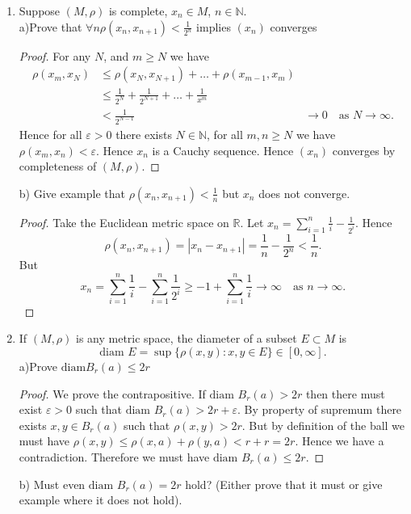 
\begin{enumerate}
	\item Suppose $(M, \rho)$ is complete, $x_n \in M$, $n \in \mathbb{N}$.\\
		a)Prove that $\forall n \rho(x_n, x_{n+1}) < \frac{1}{2^n}$ implies $(x_n)$ converges
		\begin{proof}
			For any $N$, and $m\ge N$ we have
			\begin{align*}
				\rho(x_m, x_N) &\le \rho(x_N, x_{N+1}) + \ldots + \rho(x_{m-1}, x_m) \\
				&\le \frac{1}{2^N} + \frac{1}{2^{N+1}} + \ldots + \frac{1}{x^m} \\
				&< \frac{1}{2^{N-1}}
				& \to  0 \quad \text{as }N \to  \infty 
			.\end{align*}
			Hence for all $\varepsilon>0$ there exists $N \in \mathbb{N}$, for all $m, n \ge N$ we have $\rho(x_m, x_n) < \varepsilon$. Hence $x_n$ is a Cauchy sequence. Hence $(x_n)$ converges by completeness of $(M, \rho)$.
		\end{proof}
		b) Give example that $\rho(x_n, x_{n+1}) < \frac{1}{n}$ but $x_n$ does not converge.
		\begin{proof}
			Take the Euclidean metric space on $\mathbb{R}$. Let $x_n = \sum_{i=1}^{n} \frac{1}{i} - \frac{1}{2^i}$. Hence
			\[
				\rho(x_n, x_{n+1}) = \left| x_n - x_{n+1} \right|  = \frac{1}{n} - \frac{1}{2^n} < \frac{1}{n}
			.\] 
			But
			\[
				x_n = \sum_{i=1}^{n} \frac{1}{i} - \sum_{i=1}^{n} \frac{1}{2^i} \ge - 1 + \sum_{i=1}^{n} \frac{1}{i} \to  \infty \quad \text{as } n \to \infty 
			.\] 
		\end{proof}
	\item If $(M, \rho)$ is any metric space, the diameter of a subset $E \subset M$ is
		\[
			\text{diam }E = \operatorname{sup} \{\rho(x, y): x, y \in E\}  \in [0,\infty ]
		.\] 
		a)Prove $\text{diam} B_r(a) \le  2 r$
		\begin{proof}
			We prove the contrapositive. If $\text{diam }B_r(a) > 2 r$ then there must exist $\varepsilon > 0$ such that $\text{diam }B_r(a) > 2 r + \varepsilon$. 
			By property of supremum there exists $x, y \in B_r(a)$ such that $\rho(x, y)> 2 r$. But by definition of the ball we must have $\rho(x, y) \le \rho(x, a) + \rho(y, a) < r + r = 2 r$. Hence we have a contradiction. Therefore we must have $\text{diam }B_r(a) \le 2r$.
		\end{proof}
		b) Must even $\text{diam }B_r(a) = 2 r$ hold? (Either prove that it must or give example where it does not hold).

\end{enumerate}
